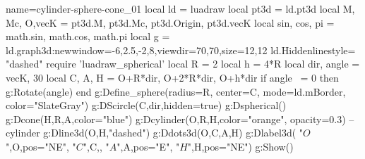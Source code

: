 \documentclass[border=3pt]{standalone}%
\begin{document}
\begin{luadraw}{name=cylinder-sphere-cone_01}
local ld = luadraw
local pt3d = ld.pt3d
local M, Mc, O,vecK = pt3d.M, pt3d.Mc, pt3d.Origin,  pt3d.vecK
local sin, cos, pi = math.sin, math.cos, math.pi
local g = ld.graph3d:new{window={-6,2.5,-2,8},viewdir={70,70},size={12,12}}
ld.Hiddenlinestyle= "dashed"
require 'luadraw_spherical'
local R = 2
local h = 4*R
local dir, angle = vecK, 30
local C, A, H = O+R*dir, O+2*R*dir, O+h*dir 
if angle ~= 0 then g:Rotate(angle) end
g:Define_sphere({radius=R, center=C, mode=ld.mBorder, color="SlateGray"})
g:DScircle({C,dir},{hidden=true})
g:Dspherical()
g:Dcone(H,R,A,{color="blue"})
g:Dcylinder(O,R,H,{color="orange", opacity=0.3}) -- cylinder
g:Dline3d(O,H,"dashed")
g:Ddots3d({O,C,A,H})
g:Dlabel3d( "$O$",O,{pos="NE"}, "$C$",C,{}, "$A$",A,{pos="E"}, "$H$",H,{pos="NE"})
g:Show()
\end{luadraw}
\end{document}
